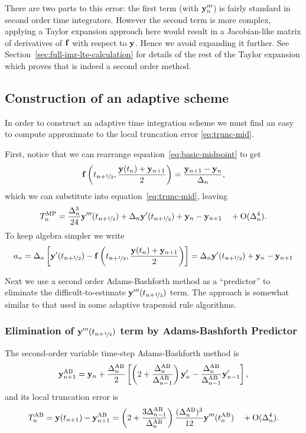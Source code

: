 There are two parts to this error: the first term (with $\yv'''_n$) is fairly standard in second order time integrators.
However the second term is more complex, applying a Taylor expansion approach here would result in a Jacobian-like matrix of derivatives of $\fv$ with respect to $\yv$.
Hence we avoid expanding it further.
See Section~\ref{sec:full-imr-lte-calculation} for details of the rest of the Taylor expansion which proves that \imr is indeed a second order method.



\subsection{Construction of an adaptive scheme}

In order to construct an adaptive time integration scheme we must find an easy to compute approximate to the local truncation error \eqref{eq:trunc-mid}.

First, notice that we can rearrange equation~\eqref{eq:basic-midpoint} to get
\begin{equation}
  \fv\left( \thf, \frac{\yv(t_n) + \yv_{n+1}}{2} \right) = \frac{\yv_{n+1} - \yv_n}{\dtn},
\end{equation}
which we can substitute into equation~\eqref{eq:trunc-mid}, leaving
\begin{equation}
  \lte^\IMP = \frac{\dtn^3}{24} \yvhf[''']  + \dtn \yvhf['] + \yv_n - \yv_{n+1}
  \porder{\dtn^4}.
\end{equation}
To keep algebra simpler we write
\begin{equation}
   \ymiderr = \dtn  \left[ \yvhf[']
  - \fv\left( \thf, \frac{\yv(t_n) + \yv_{n+1}}{2} \right) \right] =  \dtn \yvhf['] + \yv_n - \yv_{n+1}
\end{equation}

Next we use a second order Adams-Bashforth method as a ``predictor'' to eliminate the difficult-to-estimate $\yvhf[''']$ term.
The approach is somewhat similar to that used in some adaptive trapezoid rule algorithms.\cite[p.707]{Gresho-Sani}

\subsubsection{Elimination of $\yvhf[''']$ term by Adams-Bashforth Predictor}
The second-order variable time-step Adams-Bashforth method is\cite[p.267]{Gresho-Sani}
\begin{equation}
  \yv_{n+1}^{\AB} = \yv_n + \frac{\dtn^\AB}{2} \left[
    \left (2 + \frac{\dtn^\AB}{\dtx{n-1}^\AB} \right) \yv'_n
    - \frac{\dtn^\AB}{\dtx{n-1}^\AB} \yv'_{n-1}
    \right],
  \label{eq:AB2}
\end{equation}
and its local truncation error is\cite[p.267]{Gresho-Sani}
\begin{equation}
  \lte^{\AB} = \yv(t_{n+1}) - \yv_{n+1}^{\AB}
  = \left( 2 + \frac{3 \dtx{n-1}^\AB}{\dtn^\AB} \right) \frac{(\dtn^\AB)^3}{12} \yv'''(t_n^\AB)
  \porder{\dtn^4}.
  \label{eq:AB2LTE}
\end{equation}

